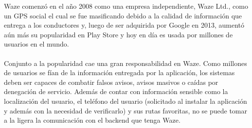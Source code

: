 Waze comenzó en el año 2008 como una empresa independiente, Waze Ltd., como un GPS social el cual se fue masificando debido a la calidad de información que entrega a los conductores y, luego de ser adquirida por Google en 2013, aumentó aún más su popularidad en Play Store y hoy en día es usada por millones de usuarios en el mundo. 
\\\\
Conjunto a la popularidad cae una gran responsabilidad en Waze. Como millones de usuarios se fían de la información entregada por la aplicación, los sistemas deben ser capaces de combatir falsos avisos, avisos masivos o caídas por denegación de servicio. Además de contar con información sensible como la localización del usuario, el teléfono del usuario (solicitado al instalar la aplicación y además con la necesidad de verificarlo) y sus rutas favoritas, no se puede tomar a la ligera la comunicación con el backend que tenga Waze.